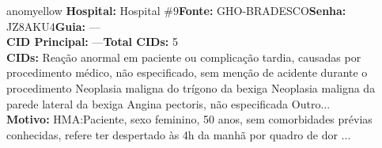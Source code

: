 \documentclass[a4paper,10pt]{article}
\begin{document}
\begin{anomalycard}[Interna\c{c}\~{a}o \#119830 | Pac. \#59525 | MODERADO (z=2.46) | LOS: 3d | 02/03/2026\,$\to$\,05/03/2026]{anomyellow}
\textbf{Hospital:} Hospital \#9\quad \textbf{Fonte:} GHO-BRADESCO\quad \textbf{Senha:} JZ8AKU4\quad \textbf{Guia:} ---\\

\textbf{CID Principal:} {\small ---}\quad\textbf{Total CIDs:} 5\\

\textbf{CIDs:} {\scriptsize Reação anormal em paciente ou complicação tardia, causadas por procedimento médico, não especificado, sem menção de acidente durante o procedimento \textbar{} Neoplasia maligna do trígono da bexiga \textbar{} Neoplasia maligna da parede lateral da bexiga \textbar{} Angina pectoris, não especificada \textbar{} Outro...}\\

\textbf{Motivo:} {\scriptsize HMA:Paciente, sexo feminino, 50 anos, sem comorbidades prévias conhecidas, refere ter despertado às 4h da manhã por quadro de dor ...}\\




\end{anomalycard}
\end{document}
